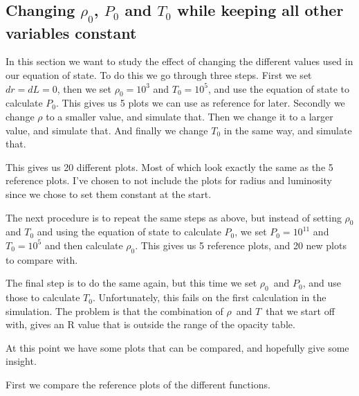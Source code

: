 \documentclass[a4paper,12pt]{article}
\begin{document}
\subsection{Changing $\rho_0$, $P_0$ and $T_0$ while keeping all other variables constant}
In this section we want to study the effect of changing the different values used in our equation of state.
To do this we go through three steps. First we set $dr = dL = 0$, then we set $\rho_0 = 10^3$ and $T_0 = 10^5$, and use the equation of state to calculate $P_0$. 
This gives us 5 plots we can use as reference for later. Secondly we change $\rho$ to a smaller value, and simulate that. 
Then we change it to a larger value, and simulate that. And finally we change $T_0$ in the same way, and simulate that.

This gives us 20 different plots. Most of which look exactly the same as the 5 reference plots. 
I've chosen to not include the plots for radius and luminosity since we chose to set them constant at the start.

The next procedure is to repeat the same steps as above, but instead of setting $\rho_0$ and $T_0$ and using the equation of state to calculate $P_0$, we set $P_0 = 10^{11}$ and $T_0 = 10^5$ and then calculate $\rho_0$. This gives us 5 reference plots, and 20 new plots to compare with.

The final step is to do the same again, but this time we set $\rho_0$ and $P_0$, and use those to calculate $T_0$. Unfortunately, this fails on the first calculation in the simulation.
The problem is that the combination of $\rho$ and $T$ that we start off with, gives an R value that is outside the range of the opacity table.

At this point we have some plots that can be compared, and hopefully give some insight.

First we compare the reference plots of the different functions.
\end{document}
